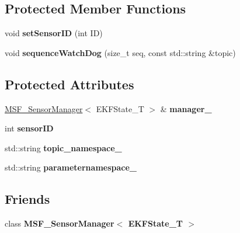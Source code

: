 \subsection*{Protected Member Functions}
\begin{DoxyCompactItemize}
\item 
\hypertarget{classmsf__core_1_1SensorHandler_acf0819310dd6421128da97a216523036}{void {\bfseries set\-Sensor\-I\-D} (int I\-D)}\label{classmsf__core_1_1SensorHandler_acf0819310dd6421128da97a216523036}

\item 
\hypertarget{classmsf__core_1_1SensorHandler_a96a37204ef5281f0cc195f22c211563e}{void {\bfseries sequence\-Watch\-Dog} (size\-\_\-t seq, const std\-::string \&topic)}\label{classmsf__core_1_1SensorHandler_a96a37204ef5281f0cc195f22c211563e}

\end{DoxyCompactItemize}
\subsection*{Protected Attributes}
\begin{DoxyCompactItemize}
\item 
\hypertarget{classmsf__core_1_1SensorHandler_aa5b9c6d345c1d2d809f7d53a0c212bf4}{\hyperlink{classmsf__core_1_1MSF__SensorManager}{M\-S\-F\-\_\-\-Sensor\-Manager}$<$ E\-K\-F\-State\-\_\-\-T $>$ \& {\bfseries manager\-\_\-}}\label{classmsf__core_1_1SensorHandler_aa5b9c6d345c1d2d809f7d53a0c212bf4}

\item 
\hypertarget{classmsf__core_1_1SensorHandler_ab6b02c25292da4a56ff7ebf3edb1b17b}{int {\bfseries sensor\-I\-D}}\label{classmsf__core_1_1SensorHandler_ab6b02c25292da4a56ff7ebf3edb1b17b}

\item 
\hypertarget{classmsf__core_1_1SensorHandler_a7795149ef5cef567fcc049bbc888c9ed}{std\-::string {\bfseries topic\-\_\-namespace\-\_\-}}\label{classmsf__core_1_1SensorHandler_a7795149ef5cef567fcc049bbc888c9ed}

\item 
\hypertarget{classmsf__core_1_1SensorHandler_a1be62365d3ce3c6cbfcca2e4e453790f}{std\-::string {\bfseries parameternamespace\-\_\-}}\label{classmsf__core_1_1SensorHandler_a1be62365d3ce3c6cbfcca2e4e453790f}

\end{DoxyCompactItemize}
\subsection*{Friends}
\begin{DoxyCompactItemize}
\item 
\hypertarget{classmsf__core_1_1SensorHandler_a8af2d8b87c3570c0ee69b7e0f4ea5077}{class {\bfseries M\-S\-F\-\_\-\-Sensor\-Manager$<$ E\-K\-F\-State\-\_\-\-T $>$}}\label{classmsf__core_1_1SensorHandler_a8af2d8b87c3570c0ee69b7e0f4ea5077}

\end{DoxyCompactItemize}


